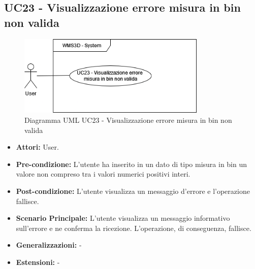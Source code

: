 \subsection{UC23 - Visualizzazione errore misura in bin non valida}
\begin{figure}[H]
  \centering
  \includegraphics[width=0.8\textwidth]{UC_diagrams_21-26/UC23.drawio.png}
   \caption{Diagramma UML UC23 - Visualizzazione errore misura in bin non valida}
\end{figure}
\begin{itemize}
    \item \textbf{Attori:} User.
    \item \textbf{Pre-condizione:}  L'utente ha inserito in un dato di tipo misura in bin un valore non compreso tra i valori numerici positivi interi.
    \item \textbf{Post-condizione:} L'utente visualizza un messaggio d'errore e l'operazione fallisce.
    \item \textbf{Scenario Principale:}  L'utente visualizza un messaggio informativo sull'errore e ne conferma la ricezione. L'operazione, di conseguenza, fallisce.
    \item \textbf{Generalizzazioni:} -
    \item \textbf{Estensioni:} -
\end{itemize}